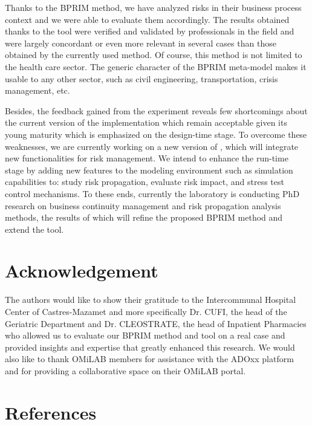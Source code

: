 \documentclass[preprint,3p,times,number]{elsarticle}
\begin{document}
Thanks to the BPRIM method, we have analyzed risks in their business process context and we were able to evaluate them accordingly. The results obtained thanks to the \adobprim{} tool were verified and validated by professionals in the field and were largely concordant or even more relevant in several cases than those obtained by the currently used method. Of course, this method is not limited to the health care sector. The generic character of the BPRIM meta-model makes it usable to any other sector, such as civil engineering, transportation, crisis management, etc.

Besides, the feedback gained from the experiment reveals few shortcomings about the current version of the \adobprim{} implementation which remain acceptable given its young maturity which is emphasized on the design-time stage. To overcome these weaknesses, we are currently working on a new version of \adobprim{}, which will integrate new functionalities for risk management. We intend to enhance the run-time stage by adding new features to the modeling environment such as simulation capabilities to: study risk propagation, evaluate risk impact, and stress test control mechanisms. To these ends, currently the laboratory is conducting PhD research on business continuity management and risk propagation analysis methods, the results of which will refine the proposed BPRIM method and extend the \adobprim{} tool.

\section*{Acknowledgement}
The authors would like to show their gratitude to the Intercommunal Hospital Center of Castres-Mazamet and more specifically Dr. CUFI, the head of the Geriatric Department and Dr. CLEOSTRATE, the head of Inpatient Pharmacies who allowed us to evaluate our BPRIM method and \adobprim{} tool on a real case and provided insights and expertise that greatly enhanced this research. We would also like to thank OMiLAB members for assistance with the ADOxx platform and for providing a collaborative space on their OMiLAB portal.

\section*{References}









\end{document}

